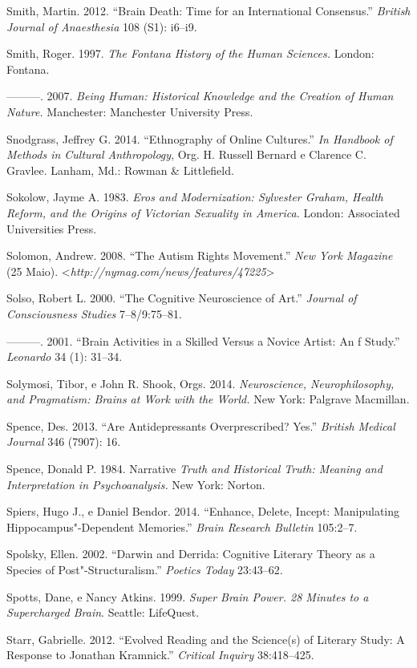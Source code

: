 Smith, Martin. 2012. ``Brain Death: Time for an International
Consensus.'' \emph{British Journal of Anaesthesia} 108 (S1): i6--i9.

Smith, Roger. 1997. \emph{The Fontana History of the Human Sciences.}
London: Fontana.

---------. 2007. \emph{Being Human: Historical Knowledge and the
Creation of Human Nature.} Manchester: Manchester University Press.

Snodgrass, Jeffrey G. 2014. ``Ethnography of Online Cultures.'' \emph{In
Handbook of Methods in Cultural Anthropology}, Org. H. Russell Bernard e
Clarence C. Gravlee. Lanham, Md.: Rowman \& Littlefield.

Sokolow, Jayme A. 1983. \emph{Eros and Modernization: Sylvester Graham,
Health Reform, and the Origins of Victorian Sexuality in America.}
London: Associated Universities Press.

Solomon, Andrew. 2008. ``The Autism Rights Movement.'' \emph{New York
Magazine} (25 Maio). \textless{}\emph{http://nymag.com/news/features/47225}\textgreater{}

Solso, Robert L. 2000. ``The Cognitive Neuroscience of Art.''
\emph{Journal of Consciousness Studies} 7--8/9:75--81.

---------. 2001. ``Brain Activities in a Skilled Versus a Novice Artist:
An f Study.'' \emph{Leonardo} 34 (1): 31--34.

Solymosi, Tibor, e John R. Shook, Orgs. 2014. \emph{Neuroscience,
Neurophilosophy, and Pragmatism: Brains at Work with the World.} New
York: Palgrave Macmillan.

Spence, Des. 2013. ``Are Antidepressants Overprescribed? Yes.''
\emph{British Medical Journal} 346 (7907): 16.

Spence, Donald P. 1984. Narrative \emph{Truth and Historical Truth:
Meaning and Interpretation in Psychoanalysis.} New York: Norton.

Spiers, Hugo J., e Daniel Bendor. 2014. ``Enhance, Delete, Incept:
Manipulating Hippocampus"-Dependent Memories.'' \emph{Brain Research
Bulletin} 105:2--7.

Spolsky, Ellen. 2002. ``Darwin and Derrida: Cognitive Literary Theory as
a Species of Post"-Structuralism.'' \emph{Poetics Today} 23:43--62.

Spotts, Dane, e Nancy Atkins. 1999. \emph{Super Brain Power. 28 Minutes
to a Supercharged Brain}. Seattle: LifeQuest.

Starr, Gabrielle. 2012. ``Evolved Reading and the Science(s) of Literary
Study: A Response to Jonathan Kramnick.'' \emph{Critical Inquiry}
38:418--425.

